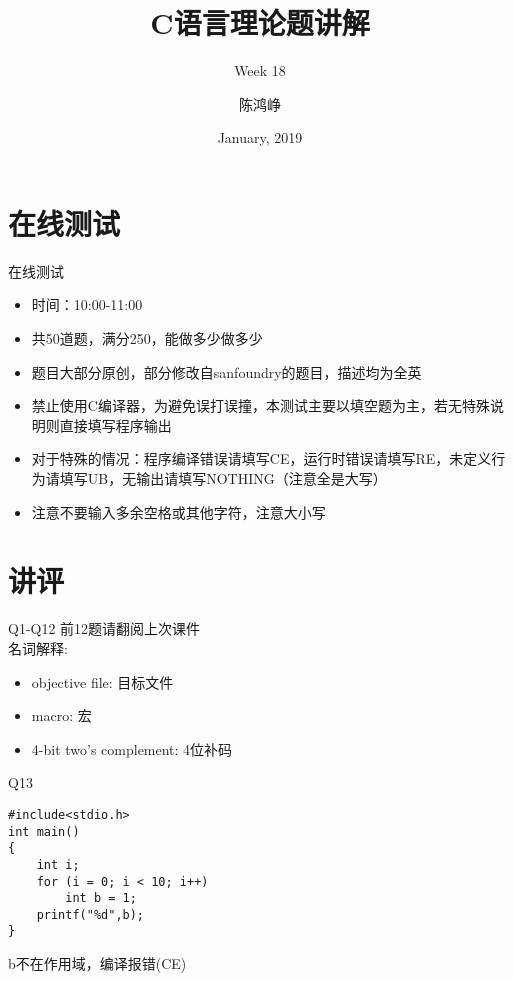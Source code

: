 \documentclass[UTF8]{ctexbeamer}
\title{C语言理论题讲解}
\subtitle{Week 18}
\author[chhzh123]{陈鸿峥}
\date[Jan, 2019]{January, 2019}
\begin{document}
\begin{frame}
\titlepage
\end{frame}

\begin{frame}
\tableofcontents[subsectionstyle=show]
\end{frame}

\section{在线测试}
\begin{frame}
\sectionpage
\end{frame}

\begin{frame}{在线测试}
\begin{itemize}
	\item 时间：10:00-11:00
	\item 共50道题，满分250，能做多少做多少
	\item 题目大部分原创，部分修改自sanfoundry的题目，描述均为全英
	\item 禁止使用C编译器，为避免误打误撞，本测试主要以填空题为主，若无特殊说明则直接填写程序输出
	\item 对于特殊的情况：程序编译错误请填写CE，运行时错误请填写RE，未定义行为请填写UB，无输出请填写NOTHING（注意全是大写）
	\item 注意不要输入多余空格或其他字符，注意大小写
\end{itemize}
\end{frame}

\section{讲评}
\begin{frame}
\sectionpage
\end{frame}

\begin{frame}{Q1-Q12}
前12题请翻阅上次课件\\
名词解释:
\begin{itemize}
	\item objective file: 目标文件
	\item macro: 宏
	\item 4-bit two's complement: 4位补码
\end{itemize}
\end{frame}

\begin{frame}[fragile]{Q13}
\begin{lstlisting}
#include<stdio.h>
int main()
{
    int i;
    for (i = 0; i < 10; i++)
        int b = 1;
    printf("%d",b);
}
\end{lstlisting}
b不在作用域，编译报错(CE)
\end{frame}
\end{document}
